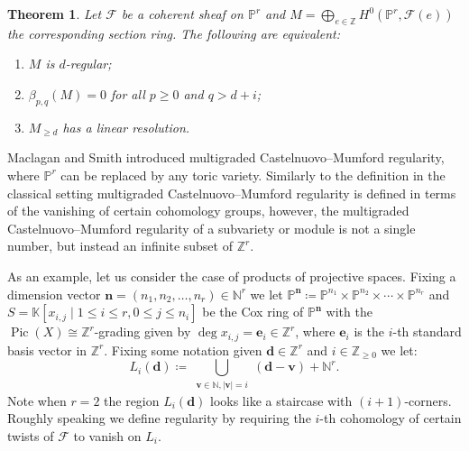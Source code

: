 \documentclass[11pt,reqno]{amsart}
\newtheorem{theorem}[lemma]{Theorem}
\newtheorem{defn}[lemma]{Definition}
\theoremstyle{remark}
\newcommand{\reg}{\operatorname{reg}}
\newcommand{\Pic}{\operatorname{Pic}}
\newcommand{\dd}{\mathbf d}
\newcommand{\ee}{\mathbf e}
\newcommand{\vv}{\mathbf v}
\newcommand{\nn}{\mathbf n}
\newcommand{\cF}{\mathcal{F}}
\newcommand{\C}{\mathbb{C}}
\newcommand{\K}{\mathbb{K}}
\newcommand{\N}{\mathbb{N}}
\renewcommand{\P}{\mathbb{P}}
\newcommand{\Z}{\mathbb{Z}}
\begin{document}

%


\begin{theorem}\cite{eisenbudGoto84}\label{thm:eisenbud-goto}
Let $\cF$ be a coherent sheaf on $\P^{r}$ and $M=\bigoplus_{e\in\Z} H^0(\P^{r},\cF(e))$ the corresponding section ring. The following are equivalent:
\begin{enumerate}
\item $M$ is $d$-regular;
\item $\beta_{p,q}(M)=0$ for all $p\geq0$ and $q>d+i$;
\item $M_{\geq d}$ has a linear resolution. 
\end{enumerate}
\end{theorem}

Maclagan and Smith introduced multigraded Castelnuovo--Mumford regularity, where $\P^{r}$ can be replaced by any toric variety. Similarly to the definition in the classical setting multigraded Castelnuovo--Mumford regularity is defined in terms of the vanishing of certain cohomology groups, however, the multigraded Castelnuovo--Mumford regularity of a subvariety or module is not a single number, but instead an infinite subset of $\Z^{r}$. 

As an example, let us consider the case of products of projective spaces. Fixing a dimension vector $\nn=(n_1,n_2,\ldots,n_{r})\in \N^{r}$ we let $\P^{\nn}\coloneqq \P^{n_1}\times \P^{n_2}\times \cdots \times \P^{n_r}$ and $S=\K[x_{i,j} \; |\; 1\leq i \leq r, 0\leq j \leq n_{i}]$ be the Cox ring of $\P^{\nn}$ with the $\Pic(X)\cong \Z^{r}$-grading given by $\deg x_{i,j} = \ee_{i} \in \Z^{r}$, where $\ee_{i}$ is the $i$-th standard basis vector in $\Z^{r}$. Fixing some notation given $\dd\in \Z^{r}$ and $i\in \Z_{\geq0}$ we let:
\[
L_{i}(\dd)\coloneqq \bigcup_{\substack{\vv \in \N, |\vv| = i}} (\dd-\vv)+\N^{r}.
\]
Note when $r=2$ the region $L_{i}(\dd)$ looks like a staircase with $(i+1)$-corners. Roughly speaking we define regularity by requiring the $i$-th cohomology of certain twists of $\cF$ to vanish on $L_{i}$. 
\end{document}
